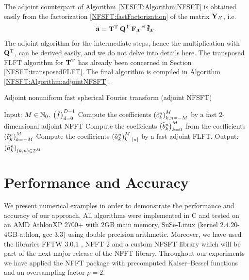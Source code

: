 The adjoint counterpart of Algorithm \ref{NFSFT:Algorithm:NFSFT} is obtained easily from the factorization 
\eqref{NFSFT:fastFactorization} of the matrix $\mathbf{Y}_{\mathcal{X}}$, i.e.
\[
  \mathbf{\tilde{a}} = \mathbf{T}^{\text{\rm{T}}} \: \mathbf{Q}^{\text{\rm{T}}} \: {\mathbf{F}_{\mathcal{X}}}^{\text{\rm{H}}} \: \mathbf{\tilde{f}}_{\mathcal{X}}.
\]
The adjoint algorithm for the intermediate steps, hence the multiplication with $\mathbf{Q}^{\text{\rm{T}}}$, can be derived easily, 
and we do not delve into details here. The transposed FLFT algorithm for $\mathbf{T}^{\text{\rm{T}}}$ has already been concerned 
in Section \ref{NFSFT:transposedFLFT}. The final algorithm is compiled in Algorithm \ref{NFSFT:Algorithm:adjointNFSFT}.

\begin{algorithm}[tb]
  \caption{Adjoint nonuniform fast spherical Fourier transform (adjoint NFSFT)}
  \label{NFSFT:Algorithm:adjointNFSFT}    
  \begin{algorithmic}
    \STATE Input:  $M \in \mathbb{N}_{0}$, $\left(\tilde{f}\right)_{d=0}^{D-1}$
    \STATE Compute the coefficients $\left(\tilde{c}_{k}^n\right)_{k,n=-M}^M$ by a fast 2-dimensional adjoint NFFT
      \STATE Compute the coeffcients $\left(\tilde{b}_{k}^n\right)_{k=0}^M$ from the coefficients $\left(\tilde{c}_{k}^n\right)_{k=-M}^{M}$ 
      \STATE Compute the coefficients $\left(\tilde{a}_{k}^n\right)_{k=|n|}^{M}$ by a fast adjoint FLFT.
    \ENDFOR
    \STATE Output: $\left(\tilde{a}_{k}^n\right)_{(k,n) \in \mathcal{I}^M}$
\end{algorithmic}
\end{algorithm}

\section{Performance and Accuracy}
We present numerical examples in order to demonstrate the performance and accuracy of our approach. All algorithms were implemented in C and tested on an 
AMD Athlon\texttrademark XP 2700+ with 2GB main memory, SuSe-Linux 
(kernel 2.4.20-4GB-athlon, gcc 3.3) using double precision arithmetic. 
Moreover, we have used the libraries FFTW 3.0.1 \cite{fftw}, NFFT 2
\cite{kupo02C} and a custom NFSFT library which will be part of the next 
major release of the NFFT library. Throughout our experiments we have 
applied the NFFT package \cite{kupo02C} with precomputed Kaiser--Bessel 
functions and an oversampling factor $\rho=2$.

